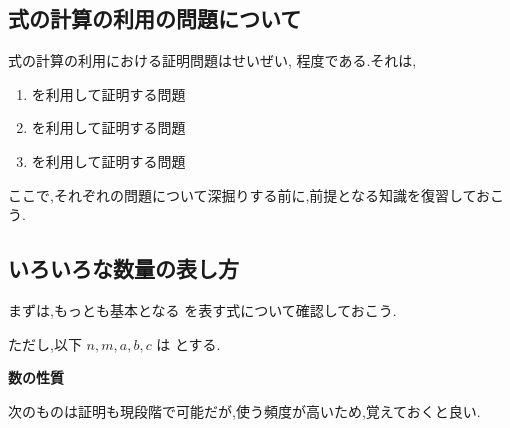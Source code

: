 \subsection{式の計算の利用の問題について}

式の計算の利用における証明問題はせいぜい,\fitblankbf[3パターン]{} 程度である.それは,

\begin{enumerate}
  \item \fitblankbf[数の性質]{} を利用して証明する問題
  \item \fitblankbf[図形の性質]{} を利用して証明する問題
  \item \fitblankbf[規則性]{} を利用して証明する問題
\end{enumerate}

ここで,それぞれの問題について深掘りする前に,前提となる知識を復習しておこう.

\subsection{いろいろな数量の表し方}

まずは,もっとも基本となる \fitblankbf[数の性質]{} を表す式について確認しておこう.

ただし,以下 $n,m,a,b,c$ は \fitblankbf[整数]{} とする.
\vspace{1em}

\begin{techniquebox}{\textbf{数の性質}}
  \label{techniquebox:数の性質}
  \begin{techniquetable}
  \end{techniquetable}
\end{techniquebox}

次のものは証明も現段階で可能だが,使う頻度が高いため,覚えておくと良い.

